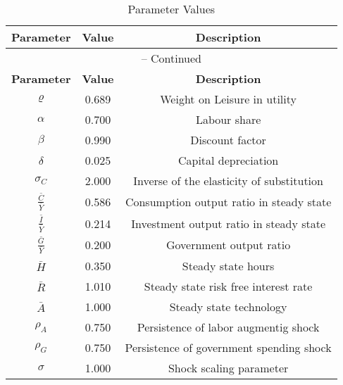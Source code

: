 \begin{center}
\begin{longtable}{ccc}
\caption{Parameter Values}\\%
\toprule%
\multicolumn{1}{c}{\textbf{Parameter}} &
\multicolumn{1}{c}{\textbf{Value}} &
 \multicolumn{1}{c}{\textbf{Description}}\\%
\midrule%
\endfirsthead
\multicolumn{3}{c}{{\tablename} \thetable{} -- Continued}\\%
\midrule%
\multicolumn{1}{c}{\textbf{Parameter}} &
\multicolumn{1}{c}{\textbf{Value}} &
  \multicolumn{1}{c}{\textbf{Description}}\\%
\midrule%
\endhead
${\varrho}$ 	 & 	 0.689 	 & 	 Weight on Leisure in utility\\
${\alpha}$ 	 & 	 0.700 	 & 	 Labour share\\
${\beta}$ 	 & 	 0.990 	 & 	 Discount factor\\
${\delta}$ 	 & 	 0.025 	 & 	 Capital depreciation\\
${\sigma_{C}}$ 	 & 	 2.000 	 & 	 Inverse of the elasticity of substitution\\
$\frac{\bar{C}}{\bar{Y}}$ 	 & 	 0.586 	 & 	 Consumption output ratio in steady state\\
$\frac{\bar{I}}{\bar{Y}}$ 	 & 	 0.214 	 & 	 Investment output ratio in steady state\\
$\frac{\bar{G}}{\bar{Y}}$ 	 & 	 0.200 	 & 	 Government output ratio\\
$\bar{H}$ 	 & 	 0.350 	 & 	 Steady state hours\\
$\bar{R}$ 	 & 	 1.010 	 & 	 Steady state risk free interest rate\\
$\bar{A}$ 	 & 	 1.000 	 & 	 Steady state technology\\
${\rho_{A}}$ 	 & 	 0.750 	 & 	 Persistence of labor augmentig shock\\
${\rho_{G}}$ 	 & 	 0.750 	 & 	 Persistence of government spending shock\\
${\sigma}$ 	 & 	 1.000 	 & 	 Shock scaling parameter\\
\bottomrule%
\end{longtable}
\end{center}
